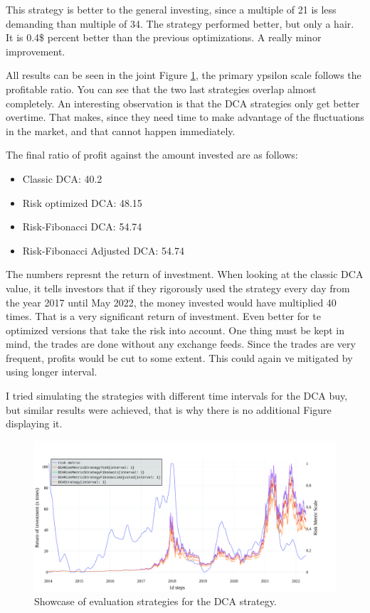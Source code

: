 This strategy is better to the general investing, since a multiple of 21 is less demanding than multiple of 34. The strategy performed better, but only a hair. It is 0.4\$ percent better than the previous optimizations. A really minor improvement.

All results can be seen in the joint Figure \ref{figure-dca-investing}, the primary ypsilon scale follows the profitable ratio. You can see that the two last strategies overlap almost completely. An interesting observation is that the DCA strategies only get better overtime. That makes, since they need time to make advantage of the fluctuations in the market, and that cannot happen immediately.

The final ratio of profit against the amount invested are as follows:
\begin{itemize}
    \item Classic DCA: 40.2
    \item Risk optimized DCA: 48.15
    \item Risk-Fibonacci DCA: 54.74
    \item Risk-Fibonacci Adjusted DCA: 54.74
\end{itemize}

The numbers represnt the return of investment. When looking at the classic DCA value, it tells investors that if they rigorously used the strategy every day from the year 2017 until May 2022, the money invested would have multiplied 40 times. That is a very significant return of investment. Even better for te optimized versions that take the risk into account. One thing must be kept in mind, the trades are done without any exchange feeds. Since the trades are very frequent, profits would be cut to some extent. This could again ve mitigated by using longer interval.

I tried simulating the strategies with different time intervals for the DCA buy, but similar results were achieved, that is why there is no additional Figure displaying it.

\begin{figure}[!hbt]
    \centering
    \includegraphics[width=\columnwidth]{figures/combined-dca-investing.pdf}
    \caption{Showcase of evaluation strategies for the DCA strategy.}
    \label{figure-dca-investing}
\end{figure}

